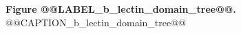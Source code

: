 \clearpage
{\large\textbf{Figure @@LABEL_b_lectin_domain_tree@@.} @@CAPTION_b_lectin_domain_tree@@\par}

